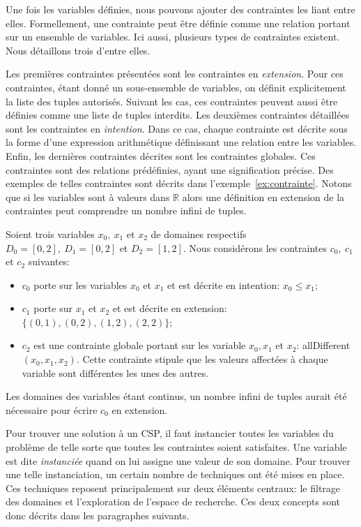 Une fois les variables définies, nous pouvons ajouter des contraintes
les liant entre elles. Formellement, une contrainte peut être définie
comme une relation portant sur un ensemble de variables.  Ici aussi,
plusieurs types de contraintes existent. Nous détaillons trois d'entre
elles.

Les premières contraintes présentées sont les contraintes en {\it
  extension}. Pour ces contraintes, étant donné un sous-ensemble de
variables, on définit explicitement la liste des tuples
autorisés. Suivant les cas, ces contraintes peuvent aussi être définies
comme une liste de tuples interdits. Les deuxièmes contraintes
détaillées sont les contraintes en {\it intention}. Dans ce cas,
chaque contrainte est décrite sous la forme d'une expression arithmétique
définissant  une relation entre les variables. Enfin, les dernières
contraintes décrites sont les contraintes globales. Ces contraintes
sont des relations prédéfinies, ayant une signification précise. Des
exemples de telles contraintes sont décrits dans
l'exemple~\ref{ex:contrainte}. Notons que si les variables sont à
valeurs dans $\mathbb{R}$ alors une définition en extension de la
contraintes peut comprendre un nombre infini de tuples.

\begin{ex}
\label{ex:contrainte}
  Soient trois variables $x_0,\ x_1$ et $x_2$ de domaines respectifs
  $D_0=[0,2],\ 
  D_1=[0,2]$ et $D_2=[1,2]$. 
  Nous considérons les contraintes $c_0,\ c_1$ et $c_2$ suivantes:
  \begin{itemize}
  \item $c_0$ porte sur les variables $x_0$ et $x_1$ et est décrite en
    intention: $x_0 \le x_1$; 
  \item $c_1$ porte sur $x_1$ et $x_2$ et est décrite en extension:
    $\{(0,1) , (0,2), (1,2), (2,2)\}$; 
  \item $c_2$ est une contrainte  globale portant sur les variable
    $x_0,x_1$ et $x_2$: allDifferent$(x_0,x_1,x_2)$. Cette contrainte
    stipule que les valeurs affectées à chaque variable sont
    différentes les unes des autres. 
  \end{itemize}
  Les domaines des variables étant continus, un nombre infini de
tuples aurait été nécessaire pour écrire $c_0$ en extension.
\end{ex}

Pour trouver une solution à un CSP, il faut instancier toutes les
variables du problème de telle sorte que toutes les contraintes
soient satisfaites. Une variable est dite {\it instanciée} quand on
lui assigne une valeur de son domaine. Pour trouver une telle
instanciation, un certain nombre de techniques ont été mises en
place. Ces techniques reposent principalement sur deux éléments
centraux: le filtrage des domaines et l'exploration de l'espace de
recherche. Ces deux concepts sont donc décrits dans les paragraphes
suivants. 



